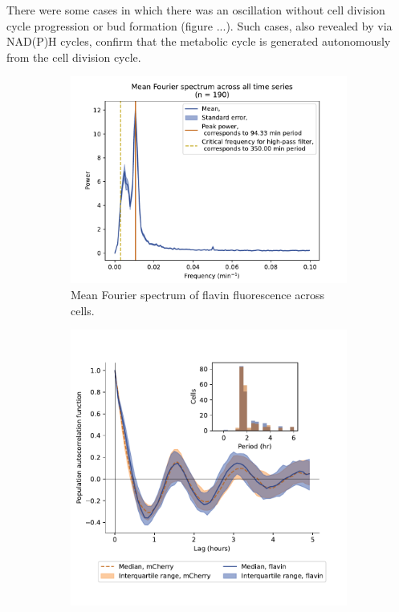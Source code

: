 There were some cases in which there was an oscillation without cell division cycle progression or bud formation (figure ...).
Such cases, also revealed by \textcite{papagiannakisAutonomousMetabolicOscillations2017} via NAD(P)H cycles, confirm that the metabolic cycle is generated autonomously from the cell division cycle.


\begin{figure}
  \centering
  \begin{subfigure}[htpb]{0.4\textwidth}
   \centering
   \includegraphics[width=\textwidth]{htb2mCherry_26643_14}
   \caption{
    Mean Fourier spectrum of flavin fluorescence across cells.
   }
   \label{fig:biology-highglc-sync-fourier}
  \end{subfigure}%
  \begin{subfigure}[htpb]{0.4\textwidth}
   \centering
   \includegraphics[width=\textwidth]{htb2mCherry_26643_12}

\end{subfigure}
\end{figure}
